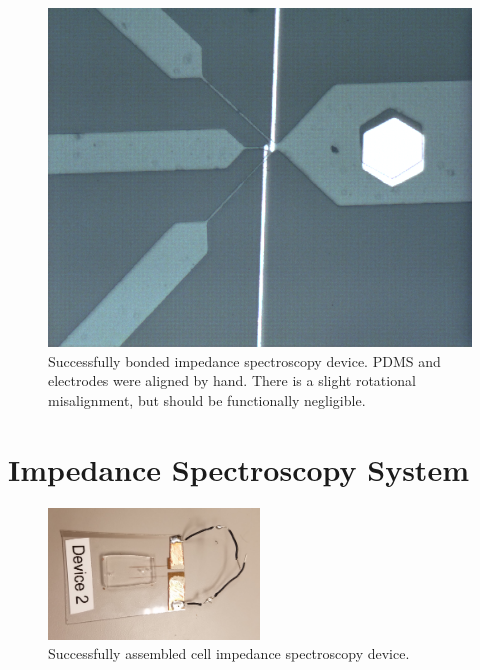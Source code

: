 \begin{figure}[h]
    \centering
    \includegraphics[width=\textwidth]{images/good_device.png}
    \caption{Successfully bonded impedance spectroscopy device. PDMS and electrodes were aligned by hand. There is a slight rotational misalignment, but should be functionally negligible.}
    \label{fig:good_device}
\end{figure}

\FloatBarrier

\section{Impedance Spectroscopy System}

\begin{figure}[h]
    \centering
    \includegraphics[width=0.5\textwidth]{images/device_22.jpg}
    \caption{Successfully assembled cell impedance spectroscopy device.}
    \label{fig:my_label}
\end{figure}

